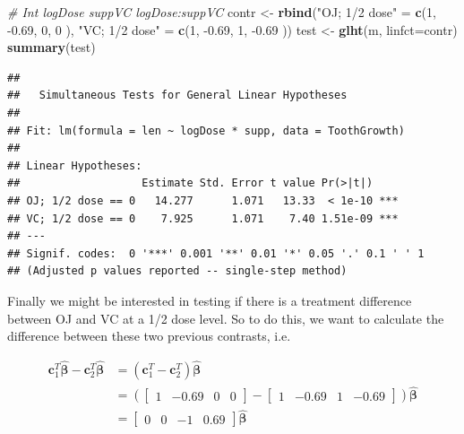 \documentclass[]{book}
\newenvironment{Shaded}{\begin{snugshade}}{\end{snugshade}}
\newcommand{\KeywordTok}[1]{\textcolor[rgb]{0.13,0.29,0.53}{\textbf{{#1}}}}
\newcommand{\DataTypeTok}[1]{\textcolor[rgb]{0.13,0.29,0.53}{{#1}}}
\newcommand{\DecValTok}[1]{\textcolor[rgb]{0.00,0.00,0.81}{{#1}}}
\newcommand{\FloatTok}[1]{\textcolor[rgb]{0.00,0.00,0.81}{{#1}}}
\newcommand{\StringTok}[1]{\textcolor[rgb]{0.31,0.60,0.02}{{#1}}}
\newcommand{\CommentTok}[1]{\textcolor[rgb]{0.56,0.35,0.01}{\textit{{#1}}}}
\newcommand{\NormalTok}[1]{{#1}}
\theoremstyle{definition}
\theoremstyle{definition}
\theoremstyle{remark}
\begin{document}
\begin{Shaded}
\begin{Highlighting}[]
\CommentTok{#                                Int  logDose  suppVC   logDose:suppVC}
\NormalTok{contr <-}\StringTok{ }\KeywordTok{rbind}\NormalTok{(}\StringTok{"OJ; 1/2 dose"} \NormalTok{=}\StringTok{ }\KeywordTok{c}\NormalTok{(}\DecValTok{1}\NormalTok{,   -}\FloatTok{0.69}\NormalTok{,    }\DecValTok{0}\NormalTok{,          }\DecValTok{0}         \NormalTok{),}
               \StringTok{"VC; 1/2 dose"} \NormalTok{=}\StringTok{ }\KeywordTok{c}\NormalTok{(}\DecValTok{1}\NormalTok{,   -}\FloatTok{0.69}\NormalTok{,    }\DecValTok{1}\NormalTok{,        -}\FloatTok{0.69}       \NormalTok{))}
\NormalTok{test <-}\StringTok{ }\KeywordTok{glht}\NormalTok{(m, }\DataTypeTok{linfct=}\NormalTok{contr)}
\KeywordTok{summary}\NormalTok{(test)}
\end{Highlighting}
\end{Shaded}

\begin{verbatim}
## 
##   Simultaneous Tests for General Linear Hypotheses
## 
## Fit: lm(formula = len ~ logDose * supp, data = ToothGrowth)
## 
## Linear Hypotheses:
##                   Estimate Std. Error t value Pr(>|t|)    
## OJ; 1/2 dose == 0   14.277      1.071   13.33  < 1e-10 ***
## VC; 1/2 dose == 0    7.925      1.071    7.40 1.51e-09 ***
## ---
## Signif. codes:  0 '***' 0.001 '**' 0.01 '*' 0.05 '.' 0.1 ' ' 1
## (Adjusted p values reported -- single-step method)
\end{verbatim}

Finally we might be interested in testing if there is a treatment
difference between OJ and VC at a 1/2 dose level. So to do this, we want
to calculate the difference between these two previous contrasts, i.e.

\[\begin{aligned}
\boldsymbol{c}_{1}^{T}\hat{\boldsymbol{\beta}}-\boldsymbol{c}_{2}^{T}\hat{\boldsymbol{\beta}}   &=  \left(\boldsymbol{c}_{1}^{T}-\boldsymbol{c}_{2}^{T}\right) \hat{\boldsymbol{ \beta }} \\
    &=  \left(\left[\begin{array}{cccc}
1 & -0.69 & 0 & 0\end{array}\right]-\left[\begin{array}{cccc}
1 & -0.69 & 1 & -0.69\end{array}\right]\right)\hat{\boldsymbol{\beta}} \\
    &=  \left[\begin{array}{cccc}
0 & 0 & -1 & 0.69\end{array}\right]\hat{\boldsymbol{\beta}}
\end{aligned}\]
\end{document}
